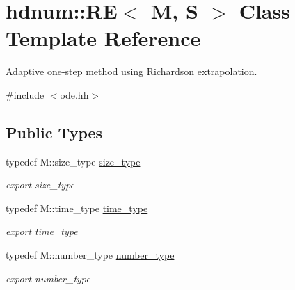 \hypertarget{classhdnum_1_1RE}{
\section{hdnum::RE$<$ M, S $>$ Class Template Reference}
\label{classhdnum_1_1RE}
}


Adaptive one-\/step method using Richardson extrapolation.  




{\ttfamily \#include $<$ode.hh$>$}

\subsection*{Public Types}
\begin{DoxyCompactItemize}
\item 
\hypertarget{classhdnum_1_1RE_ac69dd564f38accecac013e6fdfea00e1}{
typedef M::size\_\-type \hyperlink{classhdnum_1_1RE_ac69dd564f38accecac013e6fdfea00e1}{size\_\-type}}
\label{classhdnum_1_1RE_ac69dd564f38accecac013e6fdfea00e1}

\begin{DoxyCompactList}\small\item\em export size\_\-type \item\end{DoxyCompactList}\item 
\hypertarget{classhdnum_1_1RE_ae91da4bd459d3c8961c678e9ea53cdc7}{
typedef M::time\_\-type \hyperlink{classhdnum_1_1RE_ae91da4bd459d3c8961c678e9ea53cdc7}{time\_\-type}}
\label{classhdnum_1_1RE_ae91da4bd459d3c8961c678e9ea53cdc7}

\begin{DoxyCompactList}\small\item\em export time\_\-type \item\end{DoxyCompactList}\item 
\hypertarget{classhdnum_1_1RE_a0223c61d464ed8b6fd3e84878e1b6cec}{
typedef M::number\_\-type \hyperlink{classhdnum_1_1RE_a0223c61d464ed8b6fd3e84878e1b6cec}{number\_\-type}}
\label{classhdnum_1_1RE_a0223c61d464ed8b6fd3e84878e1b6cec}

\begin{DoxyCompactList}\small\item\em export number\_\-type \item\end{DoxyCompactList}\end{DoxyCompactItemize}
